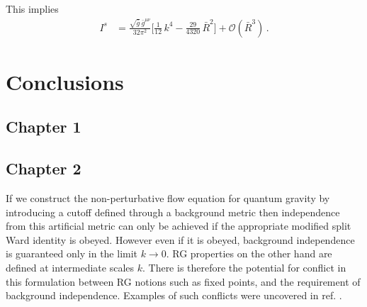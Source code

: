 \documentclass[11pt]{book} %
\numberwithin{equation}{chapter}
\begin{document}
{This implies
\begin{align}
  I^s &= \frac{ \sqrt{\bar g} \, \bar g^{\mu\nu} }{ 32 \pi^2 }
  \bigg[
    \frac{1}{12} \, k^4  - \frac{29}{4320} \, \bar R^2
  \bigg]
  + \mathcal O (\bar R^3) \,.
\end{align}




\chapter*{Conclusions}

\section*{Chapter 1}



\section*{Chapter 2}

If we construct the non-perturbative flow equation for quantum gravity by introducing a cutoff defined through
a background metric then independence from this artificial metric can only be achieved if the appropriate
modified split Ward identity is obeyed. However even if it is obeyed, background independence is guaranteed
only in the limit $k\to0$. RG properties on the other hand are defined at intermediate scales $k$.
There is therefore the potential for conflict in this formulation between RG notions such as fixed points,
and the requirement of background independence.
Examples of such conflicts were uncovered in ref. \cite{Dietz:2015owa}.

}
\end{document}
